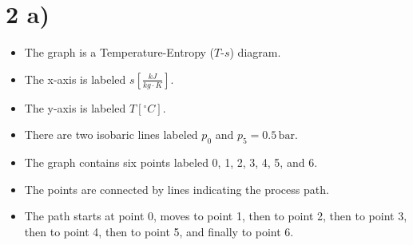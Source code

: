 \section*{2 a)}

\begin{itemize}
    \item The graph is a Temperature-Entropy ($T$-$s$) diagram.
    \item The x-axis is labeled $s \left[ \frac{kJ}{kg \cdot K} \right]$.
    \item The y-axis is labeled $T \left[ ^\circ C \right]$.
    \item There are two isobaric lines labeled $p_0$ and $p_5 = 0.5 \, \text{bar}$.
    \item The graph contains six points labeled 0, 1, 2, 3, 4, 5, and 6.
    \item The points are connected by lines indicating the process path.
    \item The path starts at point 0, moves to point 1, then to point 2, then to point 3, then to point 4, then to point 5, and finally to point 6.
\end{itemize}